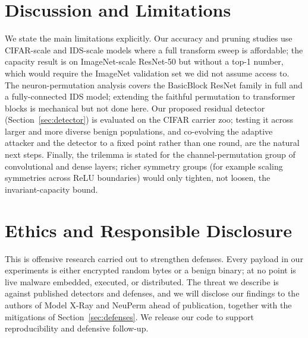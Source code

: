 \documentclass[a4paper,fleqn]{cas-dc}
\theoremstyle{plain}
\theoremstyle{remark}
\begin{document}
\section{Discussion and Limitations}\label{sec:disc}
We state the main limitations explicitly. Our accuracy and pruning studies use
CIFAR-scale and IDS-scale models where a full transform sweep is affordable; the
capacity result is on ImageNet-scale ResNet-50 but without a top-1 number, which would
require the ImageNet validation set we did not assume access to. The neuron-permutation
analysis covers the BasicBlock ResNet family in full and a fully-connected IDS model;
extending the faithful permutation to transformer blocks is mechanical but not done
here. Our proposed residual detector (Section~\ref{sec:detector}) is evaluated on the
CIFAR carrier zoo; testing it across larger and more diverse benign populations, and
co-evolving the adaptive attacker and the detector to a fixed point rather than one round,
are the natural next steps. Finally, the trilemma is stated for the channel-permutation
group of convolutional and dense layers; richer symmetry groups (for example scaling
symmetries across ReLU boundaries) would only tighten, not loosen, the invariant-capacity
bound.

\section{Ethics and Responsible Disclosure}\label{sec:ethics}
This is offensive research carried out to strengthen defenses. Every payload in our
experiments is either encrypted random bytes or a benign binary; at no point is live
malware embedded, executed, or distributed. The threat we describe is against published
detectors and defenses, and we will disclose our findings to the authors of Model X-Ray
and NeuPerm ahead of publication, together with the mitigations of
Section~\ref{sec:defenses}. We release our code to support reproducibility and
defensive follow-up.

\end{document}
